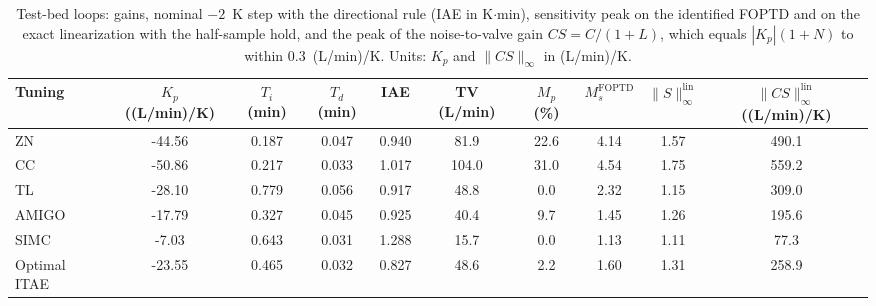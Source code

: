 \begin{table}[t]
\centering
\footnotesize
\setlength{\tabcolsep}{3pt}
\caption{Test-bed loops: gains, nominal $-2$~K step with the directional rule (IAE in K$\cdot$min), sensitivity peak on the identified FOPTD and on the exact linearization with the half-sample hold, and the peak of the noise-to-valve gain $CS = C/(1+L)$, which equals $|K_p|(1+N)$ to within $0.3$~(L/min)/K. Units: $K_p$ and $\|CS\|_\infty$ in (L/min)/K.}
\label{tab:testbed}
\begin{tabular}{lccccccccc}
\toprule
Tuning & \(K_p\) ((L/min)/K) & \(T_i\) (min) & \(T_d\) (min) & IAE & TV (L/min) & \(M_p\) (\%) & \(M_s^{\mathrm{FOPTD}}\) & \(\|S\|_\infty^{\mathrm{lin}}\) & \(\|CS\|_\infty^{\mathrm{lin}}\) ((L/min)/K) \\
\midrule
ZN & -44.56 & 0.187 & 0.047 & 0.940 & 81.9 & 22.6 & 4.14 & 1.57 & 490.1 \\
CC & -50.86 & 0.217 & 0.033 & 1.017 & 104.0 & 31.0 & 4.54 & 1.75 & 559.2 \\
TL & -28.10 & 0.779 & 0.056 & 0.917 & 48.8 & 0.0 & 2.32 & 1.15 & 309.0 \\
AMIGO & -17.79 & 0.327 & 0.045 & 0.925 & 40.4 & 9.7 & 1.45 & 1.26 & 195.6 \\
SIMC & -7.03 & 0.643 & 0.031 & 1.288 & 15.7 & 0.0 & 1.13 & 1.11 & 77.3 \\
Optimal ITAE & -23.55 & 0.465 & 0.032 & 0.827 & 48.6 & 2.2 & 1.60 & 1.31 & 258.9 \\
\bottomrule
\end{tabular}
\end{table}

